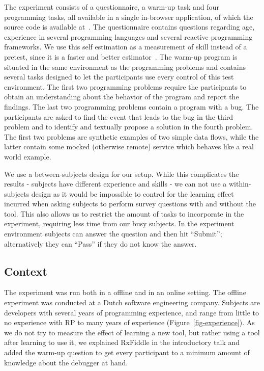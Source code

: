 The experiment consists of a questionnaire, a warm-up task and four
programming tasks, all available in a single in-browser application, of
which the source code is available at~\cite{rxfiddle-doi}.  The
questionnaire contains questions regarding age, experience in several
programming languages and several reactive programming frameworks.  We
use this self estimation as a measurement of skill instead of a pretest,
since it is a faster and better estimator~\cite{kleinschmager2011rate,feigenspan2012measuring,siegmund2014measuring}.
The warm-up program is situated in the same environment as the
programming problems and contains several tasks designed to let the
participants use every control of this test environment.  The first two
programming problems require the participants to obtain an understanding
about the behavior of the program and report the findings.  The last two
programming problems contain a program with a bug.  The participants are
asked to find the event that leads to the bug in the third problem and
to identify and textually propose a solution in the fourth problem.  The
first two problems are synthetic examples of two simple data flows,
while the latter contain some mocked (otherwise remote) service which
behaves like a real world example.

We use a between-subjects design for our setup.  While this complicates
the results - subjects have different experience and skills - we can not
use a within-subjects design as it would be impossible to control for
the learning effect incurred when asking subjects to perform survey
questions with and without the tool.  This also allows us to restrict
the amount of tasks to incorporate in the experiment, requiring less
time from our busy subjects.  In the experiment environment subjects can
answer the question and then hit ``Submit''; alternatively they can
``Pass'' if they do not know the answer.

\subsection{Context} The experiment was run both in a offline and in an
online setting.  The offline experiment was conducted at a Dutch
software engineering company.  Subjects are developers with several
years of programming experience, and range from little to no experience
with RP to many years of experience (Figure~\ref{fig-experience}).  
As we do not try to measure the effect of
learning a new tool, but rather using a tool after learning to use it,
we explained RxFiddle in the introductory talk and added the warm-up
question to get every participant to a minimum amount of knowledge about
the debugger at hand.


